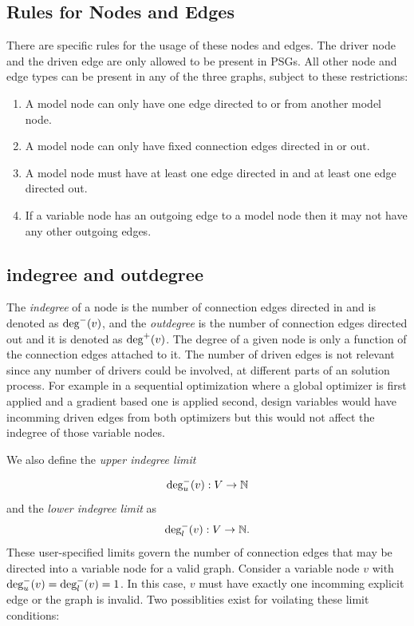 \subsection{Rules for Nodes and Edges}
  \label{ss:rules}
  There are specific rules for the usage of these nodes and edges.
  The driver node and the driven edge are only allowed to be present in PSGs. All 
  other node and edge types can be present in any of the three graphs, subject to these restrictions: 
  \begin{enumerate}
  \item A model node can only have one edge directed to or from another model node.
  \item A model node can only have fixed connection edges directed in or out.
  \item A model node must have at least one edge directed in and at least one edge 
    directed out.
  \item If a variable node has an outgoing edge to a model node then it may not have 
    any other outgoing edges.
  \end{enumerate}

\subsection{indegree and outdegree}
  \label{s:indegree-outdegree}
  The \emph{indegree} of a node is the number of connection edges directed in and 
  is denoted as $\textrm{deg}^-(v)$, and the \emph{outdegree} 
  is the number of connection edges directed out and it is denoted as $\textrm{deg}^+(v)$.
  The degree of a given node is only a function of the connection edges 
  attached to it. The number of driven edges is not relevant since any number 
  of drivers could be involved, at different parts of an solution process. For 
  example in a sequential optimization where a global optimizer is first applied
  and a gradient based one is applied second, design variables would have incomming 
  driven edges from both optimizers but this would not affect the indegree of those
  variable nodes. 

  We also define the \emph{upper indegree limit} 

  \begin{equation}
  \textrm{deg}_u^-(v):V \to \mathbb{N}
  \end{equation} 
  and the \emph{lower indegree limit} as
  \begin{equation}
  \textrm{deg}_l^-(v):V \to \mathbb{N}.
  \end{equation}
  These user-specified limits govern the number of connection edges that may 
  be directed into a variable node for a valid graph. Consider a variable 
  node $v$ with $\textrm{deg}_u^-(v) = \textrm{deg}_l^-(v) = 1$. In this case, $v$ 
  must have exactly one incomming explicit edge or the graph is invalid. 
  Two possiblities exist for voilating these limit conditions: 

